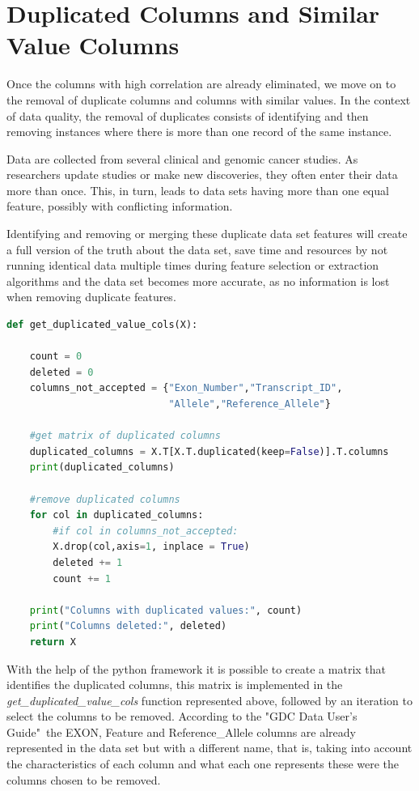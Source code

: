 \section{Duplicated Columns and Similar Value Columns}
\label{sec:duplicated_similar_columns}
\hspace{10px}Once the columns with high correlation are already eliminated, we move on to the removal of duplicate columns and columns with similar values. In the context of data quality, the removal of duplicates consists of identifying and then removing instances where there is more than one record of the same instance.

Data are collected from several clinical and genomic cancer studies. As researchers update studies or make new discoveries, they often enter their data more than once. This, in turn, leads to data sets having more than one equal feature, possibly with conflicting information.

Identifying and removing or merging these duplicate data set features will create a full version of the truth about the data set, save time and resources by not running identical data multiple times during feature selection or extraction algorithms and the data set becomes more accurate, as no information is lost when removing duplicate features.

\begin{lstlisting}[language=Python]
def get_duplicated_value_cols(X):
    
    count = 0
    deleted = 0
    columns_not_accepted = {"Exon_Number","Transcript_ID",
                            "Allele","Reference_Allele"}
    
    #get matrix of duplicated columns
    duplicated_columns = X.T[X.T.duplicated(keep=False)].T.columns
    print(duplicated_columns)
    
    #remove duplicated columns
    for col in duplicated_columns:
        #if col in columns_not_accepted: 
        X.drop(col,axis=1, inplace = True)
        deleted += 1
        count += 1
        
    print("Columns with duplicated values:", count)
    print("Columns deleted:", deleted)
    return X
\end{lstlisting}

With the help of the python framework it is possible to create a matrix that identifies the duplicated columns, this matrix is implemented in the \textit{get\_duplicated\_value\_cols} function represented above, followed by an iteration to select the columns to be removed. According to the "GDC Data User's Guide"\ the EXON, Feature and Reference\_Allele columns are already represented in the data set but with a different name, that is, taking into account the characteristics of each column and what each one represents these were the columns chosen to be removed.

